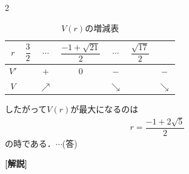 \documentclass[../../main.tex]{subfiles}
\begin{document}
\begin{multicols}{2}
  \begin{table}[H]
    \centering
    \caption{$V(r)$の増減表}
    \label{1993-3:table:1}
    \begin{tabular}{|c||c|c|c|c|c|c|}
      \hline
      $r$  & $\dfrac{3}{2}$ & $\cdots$   & $\dfrac{-1+\sqrt{21}}{2}$ & $\cdots$   & $\dfrac{\sqrt{17}}{2}$ &            \\
      \hline
      $V'$ &               & $+$        & $0$                      & $-$        &                       & $-$        \\
      \hline
      $V$  &               & $\nearrow$ &                          & $\searrow$ &                       & $\searrow$ \\
      \hline
    \end{tabular}
  \end{table}

  したがって$V(r)$が最大になるのは
  \begin{align}
    r=\dfrac{-1+2\sqrt{5}}{2}
  \end{align}
  の時である．$\cdots$(答)

  {\bf [解説]}

  \newpage
\end{multicols}
\end{document}
